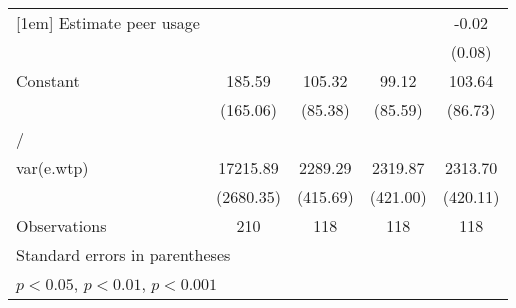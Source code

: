 \begin{table}[htbp]
\begin{tabular}{l*{4}{c}}
[1em]
Estimate peer usage&                  &                  &                  &    -0.02         \\
                &                  &                  &                  &   (0.08)         \\
[1em]
Constant        &   185.59         &   105.32         &    99.12         &   103.64         \\
                & (165.06)         &  (85.38)         &  (85.59)         &  (86.73)         \\
\hline
/               &                  &                  &                  &                  \\
var(e.wtp)      & 17215.89\sym{***}&  2289.29\sym{***}&  2319.87\sym{***}&  2313.70\sym{***}\\
                &(2680.35)         & (415.69)         & (421.00)         & (420.11)         \\
\hline
Observations    &      210         &      118         &      118         &      118         \\
\hline\hline
\multicolumn{5}{l}{\footnotesize Standard errors in parentheses}\\
\multicolumn{5}{l}{\footnotesize \sym{*} \(p<0.05\), \sym{**} \(p<0.01\), \sym{***} \(p<0.001\)}\\
\end{tabular}
\end{table}
